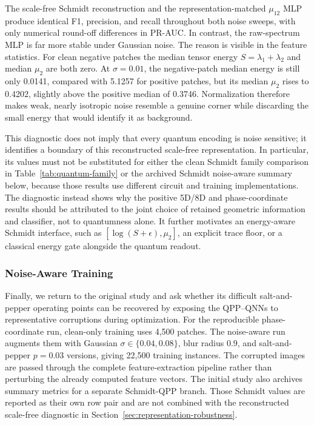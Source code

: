 \documentclass[11pt]{article}
\begin{document}
The scale-free Schmidt reconstruction and the representation-matched
$\mu_{12}$ MLP produce identical
F1, precision, and recall throughout both noise sweeps, with only numerical
round-off differences in PR-AUC.  In contrast, the raw-spectrum MLP is far
more stable under Gaussian noise.  The reason is visible in the feature
statistics.  For clean negative patches the median tensor energy
$S=\lambda_1+\lambda_2$ and median $\mu_2$ are both zero.  At
$\sigma=0.01$, the negative-patch median energy is still only 0.0141, compared
with 5.1257 for positive patches, but its median $\mu_2$ rises to 0.4202,
slightly above the positive median of 0.3746.  Normalization therefore makes
weak, nearly isotropic noise resemble a genuine corner while discarding the
small energy that would identify it as background.

This diagnostic does not imply that every quantum encoding is noise sensitive;
it identifies a boundary of this reconstructed scale-free representation.  In
particular, its values must not be substituted for either the clean Schmidt
family comparison in Table~\ref{tab:quantum-family} or the archived Schmidt
noise-aware summary below, because those results use different circuit and
training implementations.  The diagnostic instead shows why the positive
5D/8D and phase-coordinate results should be attributed to the joint choice of
retained geometric information and classifier, not to quantumness alone.  It
further motivates an energy-aware Schmidt interface,
such as $[\log(S+\epsilon),\mu_2]$, an explicit trace floor, or a classical
energy gate alongside the quantum readout.

\subsubsection{Noise-Aware Training}
\label{sec:noise-aware-training}

Finally, we return to the original study and ask whether its difficult
salt-and-pepper operating points can be recovered by exposing the QPP--QNNs to
representative corruptions during optimization.  For the reproducible
phase-coordinate run, clean-only training uses 4,500 patches.  The noise-aware
run augments them with Gaussian
$\sigma\in\{0.04,0.08\}$, blur radius 0.9, and salt-and-pepper $p=0.03$
versions, giving 22,500 training instances.  The corrupted images are passed
through the complete feature-extraction pipeline rather than perturbing the
already computed feature vectors.  The initial study also archives summary
metrics for a separate Schmidt-QPP branch.  Those Schmidt values are reported
as their own row pair and are not combined with the reconstructed scale-free
diagnostic in Section~\ref{sec:representation-robustness}.
\end{document}

